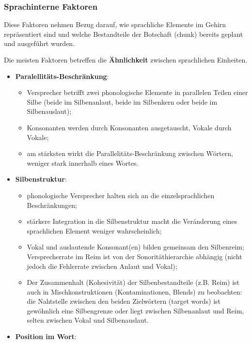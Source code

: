 \documentclass[
  letterpaper,
]{scrbook}
\providecommand{\tightlist}{%
  \setlength{\itemsep}{0pt}\setlength{\parskip}{0pt}}\usepackage{longtable,booktabs,array}
\begin{document}
\hypertarget{sprachinterne-faktoren}{%
\subsubsection{Sprachinterne Faktoren}\label{sprachinterne-faktoren}}

Diese Faktoren nehmen Bezug darauf, wie sprachliche Elemente im Gehirn
repräsentiert sind und welche Bestandteile der Botschaft (chunk) bereits
geplant und ausgeführt wurden.

Die meisten Faktoren betreffen die \textbf{Ähnlichkeit} zwischen
sprachlichen Einheiten.

\begin{itemize}
\tightlist
\item
  \textbf{Paralellitäts-Beschränkung}:

  \begin{itemize}
  \tightlist
  \item
    Versprecher betrifft zwei phonologische Elemente in parallelen
    Teilen einer Silbe (beide im Silbenanlaut, beide im Silbenkern oder
    beide im Silbenauslaut);
  \item
    Konsonanten werden durch Konsonanten ausgetauscht, Vokale durch
    Vokale;
  \item
    am stärksten wirkt die Parallelitäts-Beschränkung zwischen Wörtern,
    weniger stark innerhalb eines Wortes.
  \end{itemize}
\item
  \textbf{Silbenstruktur}:

  \begin{itemize}
  \tightlist
  \item
    phonologische Versprecher halten sich an die einzelsprachlichen
    Beschränkungen;
  \item
    stärkere Integration in die Silbenstruktur macht die Veränderung
    eines sprachlichen Element weniger wahrscheinlich;
  \item
    Vokal und auslautende Konsonant(en) bilden gemeinsam den Silbenreim;
    Versprecherrate im Reim ist von der Sonoritäthierarchie abhängig
    (nicht jedoch die Fehlerrate zwischen Anlaut und Vokal);
  \item
    Der Zusammenhalt (Kohesivität) der Silbenbestandteile (z.B. Reim)
    ist auch in Mischkonstruktionen (Kontaminationen, Blends) zu
    beobachten: die Nahtstelle zwischen den beiden Zielwörtern (target
    words) ist gewöhnlich eine Silbengrenze oder liegt zwischen
    Silbenanlaut und Reim, selten zwischen Vokal und Silbenauslaut.
  \end{itemize}
\item
  \textbf{Position im Wort}:


\end{itemize}
\end{document}
